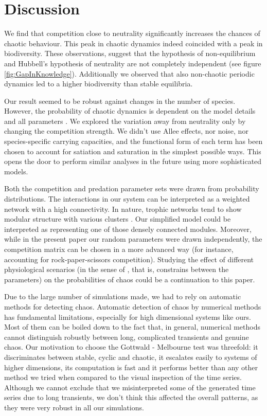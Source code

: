 \section{Discussion}
\label{sec:Discussion}
We find that competition close to neutrality significantly increases the chances of chaotic behaviour. This peak in chaotic dynamics indeed coincided with a peak in biodiversity. These observations, suggest that the hypothesis of non-equilibrium \citep{Huisman1999} and Hubbell's hypothesis of neutrality are not completely independent (see figure \ref{fig:GapInKnowledge}). Additionally we observed that also non-chaotic periodic dynamics  led to a higher biodiversity than stable equilibria.

Our result seemed to be robust against changes in the number of species. However, the probability of chaotic dynamics is dependent on the model details and all parameters \citep{Dakos2009b}. We explored the variation away from neutrality only by changing the competition strength. We didn't use Allee effects, nor noise, nor species-specific carrying capacities, and the functional form of each term has been chosen to account for satiation and saturation in the simplest possible ways. This opens the door to perform similar analyses in the future using more sophisticated models.

Both the competition and predation parameter sets were drawn from probability distributions. The interactions in our system can be interpreted as a weighted network with a high connectivity. In nature, trophic networks tend to show modular structure with various clusters \citep{Thebault2010}. Our simplified model could be interpreted as representing one of those densely connected modules. Moreover, while in the present paper our random parameters were drawn independently, the competition matrix can be chosen in a more advanced way (for instance, accounting for rock-paper-scissors competition). Studying the effect of different physiological scenarios (in the sense of \citet{Huisman2001}, that is, constrains between the parameters) on the probabilities of chaos could be a continuation to this paper.

Due to the large number of simulations made, we had to rely on automatic methods for detecting chaos. Automatic detection of chaos by numerical methods has fundamental limitations, especially for high dimensional systems like ours. Most of them can be boiled down to the fact that, in general, numerical methods cannot distinguish robustly between long, complicated transients and genuine chaos. Our motivation to choose the Gottwald - Melbourne test \citep{Gottwald2009} was threefold: it discriminates between stable, cyclic and chaotic, it escalates easily to systems of higher dimensions, its computation is fast and it performs better than any other method we tried when compared to the visual inspection of the time series. Although we cannot exclude that we misinterpreted some of the generated time series due to long transients, we don't think this affected the overall patterns, as they were very robust in all our simulations.

